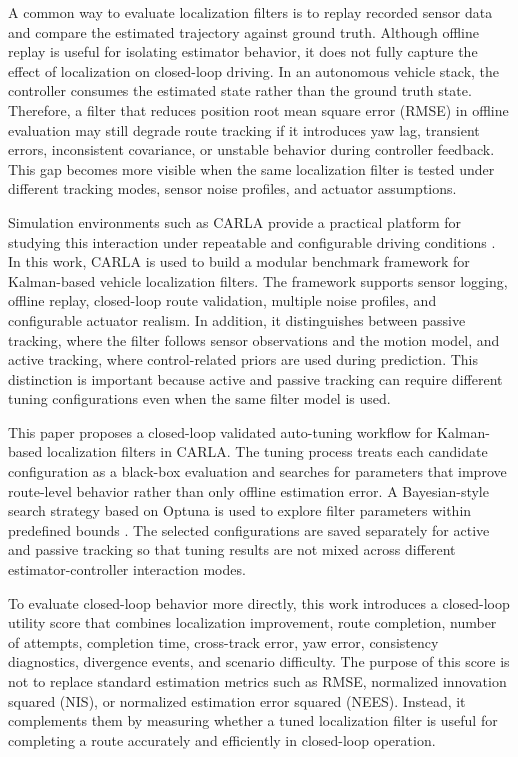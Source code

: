 \documentclass[conference]{IEEEtran}
\begin{document}
A common way to evaluate localization filters is to replay recorded sensor data and compare the estimated trajectory against ground truth. Although offline replay is useful for isolating estimator behavior, it does not fully capture the effect of localization on closed-loop driving. In an autonomous vehicle stack, the controller consumes the estimated state rather than the ground truth state. Therefore, a filter that reduces position root mean square error (RMSE) in offline evaluation may still degrade route tracking if it introduces yaw lag, transient errors, inconsistent covariance, or unstable behavior during controller feedback. This gap becomes more visible when the same localization filter is tested under different tracking modes, sensor noise profiles, and actuator assumptions.

Simulation environments such as CARLA provide a practical platform for studying this interaction under repeatable and configurable driving conditions \cite{dosovitskiy2017carla}. In this work, CARLA is used to build a modular benchmark framework for Kalman-based vehicle localization filters. The framework supports sensor logging, offline replay, closed-loop route validation, multiple noise profiles, and configurable actuator realism. In addition, it distinguishes between passive tracking, where the filter follows sensor observations and the motion model, and active tracking, where control-related priors are used during prediction. This distinction is important because active and passive tracking can require different tuning configurations even when the same filter model is used.

This paper proposes a closed-loop validated auto-tuning workflow for Kalman-based localization filters in CARLA. The tuning process treats each candidate configuration as a black-box evaluation and searches for parameters that improve route-level behavior rather than only offline estimation error. A Bayesian-style search strategy based on Optuna is used to explore filter parameters within predefined bounds \cite{bergstra2011algorithms,akiba2019optuna}. The selected configurations are saved separately for active and passive tracking so that tuning results are not mixed across different estimator-controller interaction modes.

To evaluate closed-loop behavior more directly, this work introduces a closed-loop utility score that combines localization improvement, route completion, number of attempts, completion time, cross-track error, yaw error, consistency diagnostics, divergence events, and scenario difficulty. The purpose of this score is not to replace standard estimation metrics such as RMSE, normalized innovation squared (NIS), or normalized estimation error squared (NEES). Instead, it complements them by measuring whether a tuned localization filter is useful for completing a route accurately and efficiently in closed-loop operation.
\end{document}
